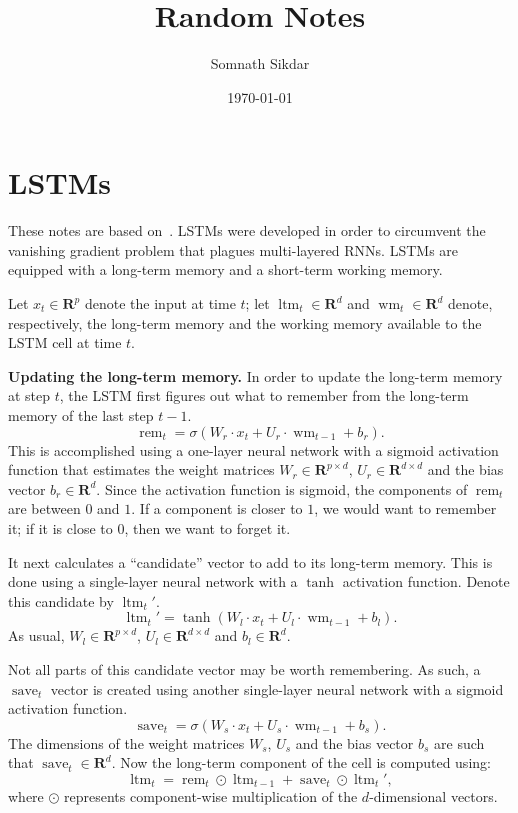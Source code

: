\documentclass[12pt]{article}
\title{Random Notes}
\author{Somnath Sikdar}
\date{\today}
\theoremstyle{definition}
\newcommand{\R}{\ensuremath{\bm{R}}}
\DeclareMathOperator{\rem}{rem}
\DeclareMathOperator{\save}{save}
\DeclareMathOperator{\ltm}{ltm}
\DeclareMathOperator{\wm}{wm}
\begin{document}
\section{LSTMs}
These notes are based on~\cite{EChen,COlah}. LSTMs were developed in order to
circumvent the vanishing gradient problem that
plagues multi-layered RNNs. LSTMs are equipped with a long-term memory and a
short-term working memory.

Let $x_t \in \R^{p}$ denote the input at time $t$; let $\ltm_{t} \in \R^{d}$
and $\wm_{t} \in \R^{d}$ denote, respectively, the long-term memory and the
working memory available to the LSTM cell at time $t$.

\medskip

\noindent \textbf{Updating the long-term memory.} In order to update the long-term
memory at step $t$, the LSTM first figures out what to remember from the
long-term memory of the last step $t - 1$.
\begin{equation}
\rem_{t} = \sigma \left ( W_r \cdot x_t + U_r \cdot \wm_{t - 1} + b_r \right ).
\end{equation}
This is accomplished using a one-layer neural network with a sigmoid activation
function that estimates the weight matrices $W_r \in \R^{p \times d}$,
$U_r \in \R^{d \times d}$ and the bias vector $b_r \in \R^{d}$. Since the
activation function is sigmoid, the components of $\rem_t$ are between $0$ and
$1$. If a component is closer to $1$, we would want to remember it; if it is
close to $0$, then we want to forget it.

It next calculates a ``candidate'' vector to add to its long-term memory. This
is done using a single-layer neural network with a $\tanh$ activation function.
Denote this candidate by $\ltm_{t}'$.
\begin{equation}
\ltm_{t}' = \tanh \left ( W_l \cdot x_t + U_l \cdot \wm_{t - 1} + b_l \right ).
\end{equation}
As usual, $W_l \in \R^{p \times d}$, $U_l \in \R^{d \times d}$ and $b_l \in \R^{d}$.

Not all parts of this candidate vector may be worth remembering. As such, a
$\save_{t}$ vector is created using another single-layer neural network with a
sigmoid activation function.
\begin{equation}
\save_{t} = \sigma \left ( W_s \cdot x_t + U_s \cdot \wm_{t - 1} + b_s \right ).
\end{equation}
The dimensions of the weight matrices $W_s$, $U_s$ and the bias vector $b_s$
are such that $\save_{t} \in \R^{d}$.
Now the long-term component of the cell is computed using:
\begin{equation}
\ltm_{t} = \rem_{t} \odot \ltm_{t - 1} + \save_{t} \odot \ltm_{t}',
\end{equation}
where $\odot$ represents component-wise multiplication of the $d$-dimensional
vectors.
\end{document}
